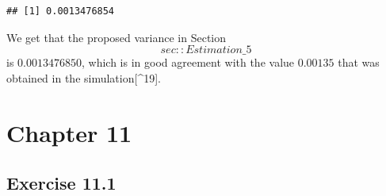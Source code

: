 \documentclass[]{krantz}
\makeatletter
\newenvironment{Shaded}{\begin{snugshade}}{\end{snugshade}}
\newcommand{\DecValTok}[1]{\textcolor[rgb]{0.00,0.00,0.81}{#1}}
\newcommand{\KeywordTok}[1]{\textcolor[rgb]{0.13,0.29,0.53}{\textbf{#1}}}
\newcommand{\NormalTok}[1]{#1}
\newcommand{\OperatorTok}[1]{\textcolor[rgb]{0.81,0.36,0.00}{\textbf{#1}}}
\newcommand{\StringTok}[1]{\textcolor[rgb]{0.31,0.60,0.02}{#1}}
\newenvironment{kframe}{%
\medskip{}
\setlength{\fboxsep}{.8em}
 \def\at@end@of@kframe{}%
 \ifinner\ifhmode%
  \def\at@end@of@kframe{\end{minipage}}%
  \begin{minipage}{\columnwidth}%
 \fi\fi%
 \def\FrameCommand##1{\hskip\@totalleftmargin \hskip-\fboxsep
 \colorbox{shadecolor}{##1}\hskip-\fboxsep
     \hskip-\linewidth \hskip-\@totalleftmargin \hskip\columnwidth}%
 \MakeFramed {\advance\hsize-\width
   \@totalleftmargin\z@ \linewidth\hsize
   \@setminipage}}%
 {\par\unskip\endMakeFramed%
 \at@end@of@kframe}
\renewenvironment{Shaded}{\begin{kframe}}{\end{kframe}}
\theoremstyle{definition}
\theoremstyle{definition}
\theoremstyle{definition}
\theoremstyle{remark}
\makeatother
\begin{document}
\begin{enumerate}
\begin{Shaded}
\end{Shaded}

\begin{verbatim}
## [1] 0.0013476854
\end{verbatim}

  We get that the proposed variance in Section~\[sec::Estimation\_5\] is
  \(0.0013476850\), which is in good agreement with the value \(0.00135\) that
  was obtained in the simulation{[}\^{}19{]}.
\end{enumerate}

\hypertarget{chapter-11}{%
\section*{Chapter 11}\label{chapter-11}}


\hypertarget{exercise-11.1}{%
\subsection*{Exercise 11.1}\label{exercise-11.1}}
\end{document}
